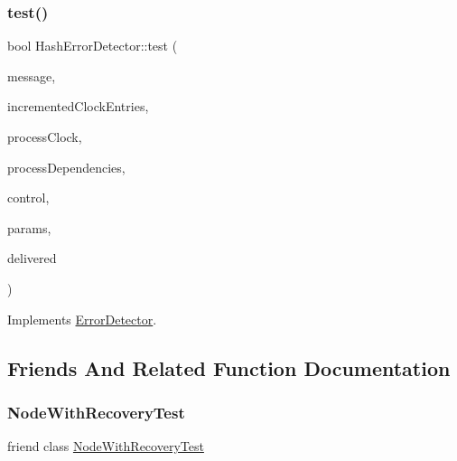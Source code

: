 \subsubsection{\texorpdfstring{test()}{test()}}
{\footnotesize\ttfamily bool Hash\+Error\+Detector\+::test (\begin{DoxyParamCaption}\item[{\hyperlink{structures_8h_a7e7bdc1d2fff8a9436f2f352b2711ed6}{message\+Info}}]{message,  }\item[{const vector$<$ unsigned int $>$ \&}]{incremented\+Clock\+Entries,  }\item[{const \hyperlink{class_probabilistic_clock}{Probabilistic\+Clock} \&}]{process\+Clock,  }\item[{const \hyperlink{class_total_dependencies}{Total\+Dependencies} \&}]{process\+Dependencies,  }\item[{\hyperlink{class_controller}{Controller} $\ast$}]{control,  }\item[{\hyperlink{class_simulation_parameters}{Simulation\+Parameters} $\ast$}]{params,  }\item[{const vector$<$ \hyperlink{structures_8h_a7e7bdc1d2fff8a9436f2f352b2711ed6}{message\+Info} $>$ \&}]{delivered }\end{DoxyParamCaption})\hspace{0.3cm}{\ttfamily [virtual]}}



Implements \hyperlink{class_error_detector_afc717d04768dd207196c08e24163115c}{Error\+Detector}.



\subsection{Friends And Related Function Documentation}
\mbox{\label{class_hash_error_detector_a4a759c82473f06c7e89c3d75a509a390}} 
\subsubsection{\texorpdfstring{Node\+With\+Recovery\+Test}{NodeWithRecoveryTest}}
{\footnotesize\ttfamily friend class \hyperlink{class_node_with_recovery_test}{Node\+With\+Recovery\+Test}\hspace{0.3cm}{\ttfamily [friend]}}

